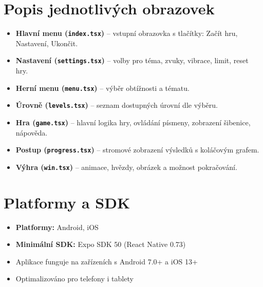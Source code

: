 \documentclass[a4paper,12pt]{article}
\begin{document}
\section{Popis jednotlivých obrazovek}

\begin{itemize}
  \item \textbf{Hlavní menu (\texttt{index.tsx})} – vstupní obrazovka s tlačítky: Začít hru, Nastavení, Ukončit.
  \item \textbf{Nastavení (\texttt{settings.tsx})} – volby pro téma, zvuky, vibrace, limit, reset hry.
  \item \textbf{Herní menu (\texttt{menu.tsx})} – výběr obtížnosti a tématu.
  \item \textbf{Úrovně (\texttt{levels.tsx})} – seznam dostupných úrovní dle výběru.
  \item \textbf{Hra (\texttt{game.tsx})} – hlavní logika hry, ovládání písmeny, zobrazení šibenice, nápověda.
  \item \textbf{Postup (\texttt{progress.tsx})} – stromové zobrazení výsledků s koláčovým grafem.
  \item \textbf{Výhra (\texttt{win.tsx})} – animace, hvězdy, obrázek a možnost pokračování.
\end{itemize}

\section{Platformy a SDK}

\begin{itemize}
  \item \textbf{Platformy:} Android, iOS
  \item \textbf{Minimální SDK:} Expo SDK 50 (React Native 0.73)
  \item Aplikace funguje na zařízeních s Android 7.0+ a iOS 13+
  \item Optimalizováno pro telefony i tablety
\end{itemize}
\end{document}
